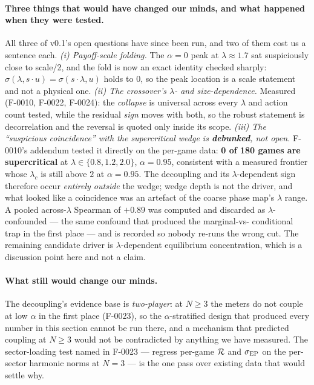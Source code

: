 \paragraph{Three things that would have changed our minds, and what happened
when they were tested.} All three of v0.1's open questions have since been run,
and two of them cost us a sentence each.
\emph{(i) Payoff-scale folding.} The $\alpha = 0$ peak at $\lambda \approx 1.7$
sat suspiciously close to scale/2, and the fold is now an exact identity checked
sharply: $\sigma(\lambda, s\cdot u) = \sigma(s\cdot\lambda, u)$ holds to
$0$, so the peak location is a scale statement and not a physical one.
\emph{(ii) The crossover's $\lambda$- and size-dependence.} Measured (F-0010,
F-0022, F-0024): the \emph{collapse} is universal across every $\lambda$ and
action count tested, while the residual \emph{sign} moves with both, so the
robust statement is decorrelation and the reversal is quoted only inside its
scope.
\emph{(iii) The ``suspicious coincidence'' with the supercritical wedge is
\textbf{debunked}, not open.} F-0010's addendum tested it directly on the
per-game data: \textbf{0 of 180 games are supercritical} at
$\lambda\in\{0.8,1.2,2.0\}$, $\alpha=0.95$, consistent with a measured
frontier whose $\lambda_c$ is still above $2$ at $\alpha = 0.95$. The
decoupling and its $\lambda$-dependent sign therefore occur \emph{entirely
outside} the wedge; wedge depth is not the driver, and what looked like a
coincidence was an artefact of the coarse phase map's $\lambda$ range. A pooled
across-$\lambda$ Spearman of $+0.89$ was computed and discarded as
$\lambda$-confounded --- the same confound that produced the marginal-vs-
conditional trap in the first place --- and is recorded so nobody re-runs the
wrong cut. The remaining candidate driver is $\lambda$-dependent equilibrium
concentration, which is a discussion point here and not a claim.

\paragraph{What still would change our minds.} The decoupling's evidence base is
\emph{two-player}: at $N \ge 3$ the meters do not couple at low $\alpha$ in the
first place (F-0023), so the $\alpha$-stratified design that produced every
number in this section cannot be run there, and a mechanism that predicted
coupling at $N \ge 3$ would not be contradicted by anything we have measured.
The sector-loading test named in F-0023 --- regress per-game $\mathcal{R}$ and $\sigma_{\mathrm{EP}}$ on
the per-sector harmonic norms at $N = 3$ --- is the one pass over existing data
that would settle why.

